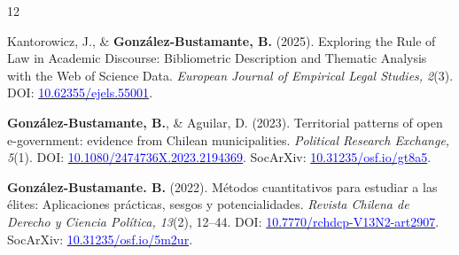 \begin{publications}

\begin{benumerate}{12}

\item{Kantorowicz, J., \& {\bfseries González-Bustamante, B.} (2025). Exploring the Rule of Law in Academic Discourse: Bibliometric Description and Thematic Analysis with the Web of Science Data. {\itshape European Journal of Empirical Legal Studies, 2}(3). DOI: \href{https://doi.org/10.62355/ejels.55001}{\textcolor{blue}{10.62355/ejels.55001}}.}\vspace{1mm}

\item{{\bfseries González-Bustamante, B.}, \& Aguilar, D. (2023). Territorial patterns of open e-government: evidence from Chilean municipalities. {\itshape Political Research Exchange, 5}(1). DOI: \href{https://doi.org/10.1080/2474736X.2023.2194369}{\textcolor{blue}{10.1080/2474736X.2023.2194369}}. SocArXiv: \href{https://doi.org/10.31235/osf.io/gt8a5}{\textcolor{blue}{10.31235/osf.io/gt8a5}}.}\vspace{1mm}


\item{{\bfseries González-Bustamante. B.} (2022). Métodos cuantitativos para estudiar a las élites: Aplicaciones prácticas, sesgos y potencialidades. {\itshape Revista Chilena de Derecho y Ciencia Política, 13}(2), 12--44. DOI: \href{https://doi.org/10.7770/rchdcp-V13N2-art2907}{\textcolor{blue}{10.7770/rchdcp-V13N2-art2907}}. SocArXiv: \href{https://doi.org/10.31235/osf.io/5m2ur}{\textcolor{blue}{10.31235/osf.io/5m2ur}}.}\vspace{1mm}



\end{benumerate}
\end{publications}

